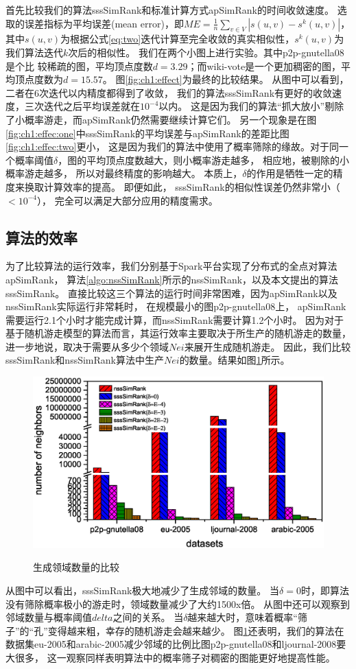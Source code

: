 \documentclass[master]{njuthesis}
\begin{document}
首先比较我们的算法sssSimRank和标准计算方式apSimRank的时间收敛速度。
选取的误差指标为平均误差(mean error)，即$ME = \frac{1}{n}\sum_{v \in V}{\left|s(u,v) - s^k(u,v)\right|}$，
其中$s(u,v)$为根据公式\ref{eq:two}迭代计算至完全收敛的真实相似性，$s^k(u,v)$为我们算法迭代$k$次后的相似性。
我们在两个小图上进行实验。其中p2p-gnutella08是个比
较稀疏的图，平均顶点度数$d=3.29$；而wiki-vote是一个更加稠密的图，平均顶点度数为$d=15.57$。
图\ref{fig:ch1:effect}为最终的比较结果。
从图中可以看到，二者在6次迭代以内精度都得到了收敛， 我们的算法sssSimRank有更好的收敛速度，三次迭代之后平均误差就在$10^{-4}$以内。
这是因为我们的算法“抓大放小”剔除了小概率游走，而apSimRank仍然需要继续计算它们。
另一个现象是在图\ref{fig:ch1:effec:one}中sssSimRank的平均误差与apSimRank的差距比图\ref{fig:ch1:effec:two}更小，
这是因为我们的算法中使用了概率筛除的缘故。对于同一个概率阈值$\delta$，图的平均顶点度数越大，则小概率游走越多， 相应地，被剔除的小概率游走越多，
所以对最终精度的影响越大。 
本质上，$\delta$的作用是牺牲一定的精度来换取计算效率的提高。
即便如此， sssSimRank的相似性误差仍然非常小（$<10^{-4}$）， 完全可以满足大部分应用的精度需求。
\subsection{算法的效率}
为了比较算法的运行效率，我们分别基于Spark平台实现了分布式的全点对算法apSimRank， 算法\ref{algo:nssSimRank}所示的nssSimRank，以及本文提出的算法sssSimRank。
直接比较这三个算法的运行时间非常困难，因为apSimRank以及nssSimRank实际运行非常耗时，
在规模最小的图p2p-gnutella08上， apSimRank需要运行2.1个小时才能完成计算，而nssSimRank需要计算1.2个小时。
因为对于基于随机游走模型的算法而言，其运行效率主要取决于所生产的随机游走的数量，进一步地说，取决于需要从多少个领域$Nei$来展开生成随机游走。
因此，我们比较sssSimRank和nssSimRank算法中生产$Nei$的数量。结果如图\ref{fig:ch1:runtime}所示。
\begin{figure}[h]
  \centering
  \includegraphics[width= 1\textwidth]{figure/neighborhoods.eps}\\
  \caption{生成领域数量的比较}\label{fig:ch1:runtime}
\end{figure}
从图中可以看出，sssSimRank极大地减少了生成邻域的数量。
当$\delta=0$时，即算法没有筛除概率极小的游走时，领域数量减少了大约1500x倍。
从图中还可以观察到邻域数量与概率阈值$delta$之间的关系。
当$\delta$越来越大时，意味着概率“筛子”的“孔”变得越来粗，幸存的随机游走会越来越少。
图\ref{fig:ch1:runtime}还表明，我们的算法在数据集eu-2005和arabic-2005减少邻域的比例比图p2p-gnutella08和ljournal-2008要大很多，
这一观察同样表明算法中的概率筛子对稠密的图能更好地提高性能。
\end{document}
